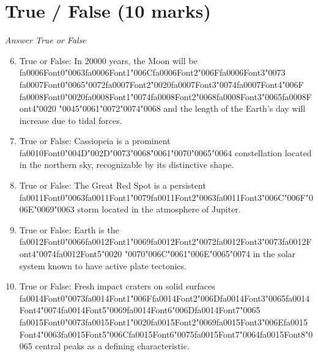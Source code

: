 \documentclass[12pt]{article}
\begin{document}
\section*{True / False (10 marks)}
\textit{Answer True or False}
\begin{enumerate}[label=\arabic*.]
\setcounter{enumi}{5}
\item True or False: In 20000 years, the Moon will be {\csname fa0006Font0\endcsname\char"0063}{\csname fa0006Font1\endcsname\char"006C}{\csname fa0006Font2\endcsname\char"006F}{\csname fa0006Font3\endcsname\char"0073} {\csname fa0007Font0\endcsname\char"0065}{\char"0072}{\csname fa0007Font2\endcsname\char"0020}{\csname fa0007Font3\endcsname\char"0074}{\csname fa0007Font4\endcsname\char"006F} {\csname fa0008Font0\endcsname\char"0020}{\csname fa0008Font1\endcsname\char"0074}{\csname fa0008Font2\endcsname\char"0068}{\csname fa0008Font3\endcsname\char"0065}{\csname fa0008Font4\endcsname\char"0020} {\char"0045}{\char"0061}{\char"0072}{\char"0074}{\char"0068} and the length of the Earth's day will increase due to tidal forces.
\item True or False: Cassiopeia is a prominent {\csname fa0010Font0\endcsname\char"004D}{\char"002D}{\char"0073}{\char"0068}{\char"0061}{\char"0070}{\char"0065}{\char"0064} constellation located in the northern sky, recognizable by its distinctive shape.
\item True or False: The Great Red Spot is a persistent {\csname fa0011Font0\endcsname\char"0063}{\csname fa0011Font1\endcsname\char"0079}{\csname fa0011Font2\endcsname\char"0063}{\csname fa0011Font3\endcsname\char"006C}{\char"006F}{\char"006E}{\char"0069}{\char"0063} storm located in the atmosphere of Jupiter.
\item True or False: Earth is the {\csname fa0012Font0\endcsname\char"0066}{\csname fa0012Font1\endcsname\char"0069}{\csname fa0012Font2\endcsname\char"0072}{\csname fa0012Font3\endcsname\char"0073}{\csname fa0012Font4\endcsname\char"0074}{\csname fa0012Font5\endcsname\char"0020} {\char"0070}{\char"006C}{\char"0061}{\char"006E}{\char"0065}{\char"0074} in the solar system known to have active plate tectonics.
\item True or False: Fresh impact craters on solid surfaces {\csname fa0014Font0\endcsname\char"0073}{\csname fa0014Font1\endcsname\char"006F}{\csname fa0014Font2\endcsname\char"006D}{\csname fa0014Font3\endcsname\char"0065}{\csname fa0014Font4\endcsname\char"0074}{\csname fa0014Font5\endcsname\char"0069}{\csname fa0014Font6\endcsname\char"006D}{\csname fa0014Font7\endcsname\char"0065} {\csname fa0015Font0\endcsname\char"0073}{\csname fa0015Font1\endcsname\char"0020}{\csname fa0015Font2\endcsname\char"0069}{\csname fa0015Font3\endcsname\char"006E}{\csname fa0015Font4\endcsname\char"0063}{\csname fa0015Font5\endcsname\char"006C}{\csname fa0015Font6\endcsname\char"0075}{\csname fa0015Font7\endcsname\char"0064}{\csname fa0015Font8\endcsname\char"0065} central peaks as a defining characteristic.
\end{enumerate}
\end{document}
